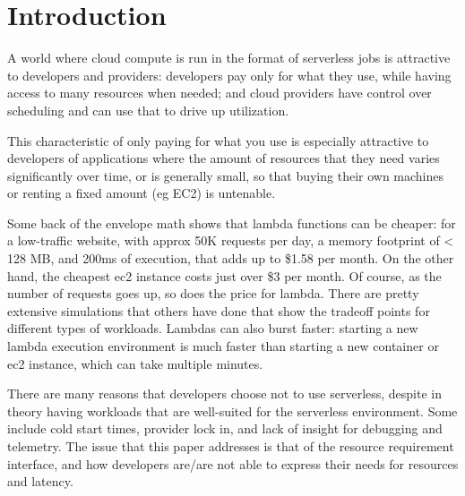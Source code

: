 \section{Introduction}

A world where cloud compute is run in the format of serverless jobs is
attractive to developers and providers: developers pay only for what they use,
while having access to many resources when needed; and cloud providers have
control over scheduling and can use that to drive up utilization.



This characteristic of only paying for what you use is especially attractive to
developers of applications where the amount of resources that they need varies
significantly over time, or is generally small, so that buying their own
machines or renting a fixed amount (eg EC2) is untenable.

Some back of the envelope math shows that lambda functions can be cheaper: for a
low-traffic website, with approx 50K requests per day, a memory footprint of <
128 MB, and 200ms of execution, that adds up to \$1.58 per month. On the other
hand, the cheapest ec2 instance costs just over \$3 per month. Of course, as the
number of requests goes up, so does the price for lambda. There are pretty
extensive simulations that others have done that show the tradeoff points for
different types of workloads.
Lambdas can also burst faster: starting a new lambda execution environment is
much faster than starting a new container or ec2 instance, which can take
multiple minutes.



There are many reasons that developers choose not to use serverless, despite in
theory having workloads that are well-suited for the serverless environment.
Some include cold start times, provider lock in, and lack of insight for
debugging and telemetry. The issue that this paper addresses is that of the
resource requirement interface, and how developers are/are not able to express
their needs for resources and latency.


